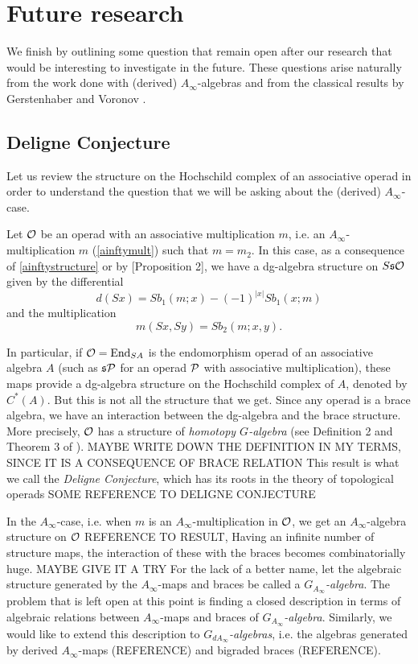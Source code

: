 \documentclass[join.tex]{subfiles}
\begin{document}
\section{Future research}

We finish by outlining some question that remain open after our research that would be interesting to investigate in the future. These questions arise naturally from the work done with (derived) $A_\infty$-algebras and from the classical results by Gerstenhaber and Voronov \cite{GV}.

\subsection{Deligne Conjecture}
Let us review the structure on the Hochschild complex of an associative operad in order to understand the question that we will be asking about the (derived) $A_\infty$-case.

Let ${\mathcal O}$ be an operad with an associative multiplication $m$, i.e. an $A_\infty$-multiplication $m$ (\cref{ainftymult}) such that $m=m_2$. In this case, as a consequence of \cref{ainftystructure} or by \cite{GV}[Proposition 2], we have a dg-algebra structure on $S\mathfrak{s}{\mathcal O}$ given by the differential
\[d(Sx) =  Sb_1(m; x) -(-1)^{|x|}Sb_1(x; m)\]
and the multiplication
\[m(Sx,Sy) = Sb_2(m;x,y).\]

In particular, if ${\mathcal O} = \operatorname{End}_{SA}$ is the endomorphism operad of an associative algebra $A$ (such as $\mathfrak{s}\mathcal{P}$ for an operad $\mathcal{P}$ with associative multiplication), these maps provide a dg-algebra structure on the Hochschild complex of $A$, denoted by $C^*(A)$. But this is not all the structure that we get. Since any operad is a brace algebra, we have an interaction between the dg-algebra and the brace structure. More precisely, ${\mathcal O}$ has a structure of \emph{homotopy $G$-algebra} (see Definition 2 and Theorem 3 of \cite{GV}). MAYBE WRITE DOWN THE DEFINITION IN MY TERMS, SINCE IT IS A CONSEQUENCE OF BRACE RELATION
 This result is what we call the \emph{Deligne Conjecture}, which has its roots in the theory of topological operads SOME REFERENCE TO DELIGNE CONJECTURE

In the $A_\infty$-case, i.e. when $m$ is an $A_\infty$-multiplication in ${\mathcal O}$, we get an $A_\infty$-algebra structure on ${\mathcal O}$ REFERENCE TO RESULT, Having an infinite number of structure maps, the interaction of these with the braces becomes combinatorially huge. MAYBE GIVE IT A TRY For the lack of a better name, let the algebraic structure generated by the $A_\infty$-maps and braces be called a \emph{$G_{A_\infty}$-algebra}. The problem that is left open at this point is finding a closed description in terms of algebraic relations between $A_\infty$-maps and braces of \emph{$G_{A_\infty}$-algebra}. Similarly, we would like to extend this description to \emph{$G_{dA_\infty}$-algebras}, i.e. the algebras generated by derived $A_\infty$-maps (REFERENCE) and bigraded braces (REFERENCE). 
\end{document}
